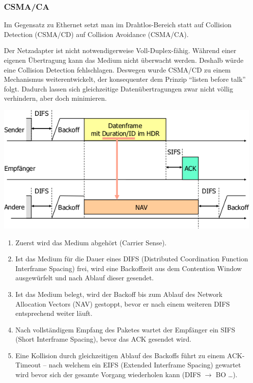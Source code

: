 \subsubsection{CSMA/CA}

Im Gegensatz zu Ethernet setzt man im Drahtlos-Bereich statt auf Collision
Detection (CSMA/CD) auf Collision Avoidance (CSMA/CA).

Der Netzadapter ist nicht notwendigerweise Voll-Duplex-fähig. Während einer
eigenen Übertragung kann das Medium nicht überwacht werden. Deshalb würde eine
Collision Detection fehlschlagen. Deswegen wurde CSMA/CD zu einem Mechanismus
weiterentwickelt, der konsequenter dem Prinzip ``listen before talk'' folgt.
Dadurch lassen sich gleichzeitige Datenübertragungen zwar nicht völlig
verhindern, aber doch minimieren.

\begin{center}
	\includegraphics[width=.8\textwidth]{media/csma_ca.png}
\end{center}

\begin{enumerate}
	\item Zuerst wird das Medium abgehört (Carrier Sense).
	\item Ist das Medium für die Dauer eines DIFS (Distributed Coordination
		Function Interframe Spacing) frei, wird eine Backoffzeit aus dem Contention
		Window ausgewürfelt und nach Ablauf dieser gesendet.
	\item Ist das Medium belegt, wird der Backoff bis zum Ablauf des Network
		Allocation Vectors (NAV) gestoppt, bevor er nach einem weiteren DIFS
		entsprechend weiter läuft.
	\item Nach vollständigem Empfang des Paketes wartet der Empfänger ein SIFS
		(Short Interframe Spacing), bevor das ACK gesendet wird.
	\item Eine Kollision durch gleichzeitigen Ablauf des Backoffs führt zu einem
		ACK-Timeout -- nach welchem ein EIFS (Extended Interframe Spacing) gewartet
		wird bevor sich der gesamte Vorgang wiederholen kann (DIFS $\rightarrow$ BO
		\ldots).
\end{enumerate}

